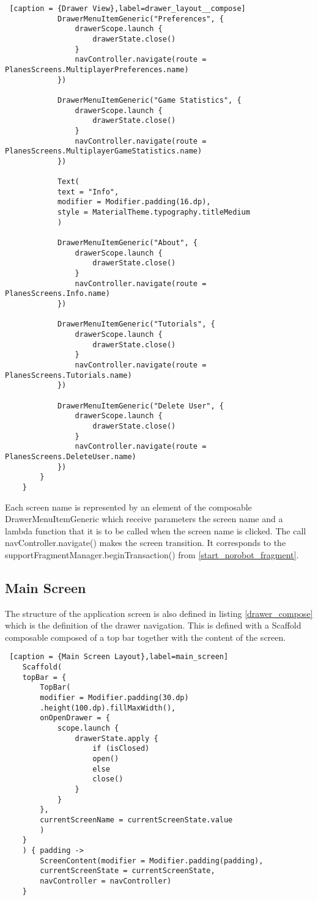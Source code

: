 \begin{lstlisting} [caption = {Drawer View},label=drawer_layout__compose]
			DrawerMenuItemGeneric("Preferences", {
				drawerScope.launch {
					drawerState.close()
				}
				navController.navigate(route = PlanesScreens.MultiplayerPreferences.name)
			})
			
			DrawerMenuItemGeneric("Game Statistics", {
				drawerScope.launch {
					drawerState.close()
				}
				navController.navigate(route = PlanesScreens.MultiplayerGameStatistics.name)
			})
			
			Text(
			text = "Info",
			modifier = Modifier.padding(16.dp),
			style = MaterialTheme.typography.titleMedium
			)
			
			DrawerMenuItemGeneric("About", {
				drawerScope.launch {
					drawerState.close()
				}
				navController.navigate(route = PlanesScreens.Info.name)
			})
			
			DrawerMenuItemGeneric("Tutorials", {
				drawerScope.launch {
					drawerState.close()
				}
				navController.navigate(route = PlanesScreens.Tutorials.name)
			})
			
			DrawerMenuItemGeneric("Delete User", {
				drawerScope.launch {
					drawerState.close()
				}
				navController.navigate(route = PlanesScreens.DeleteUser.name)
			})
		}
	}
\end{lstlisting}

Each screen name is represented by an element of the composable DrawerMenuItemGeneric which receive parameters the screen name and a lambda function that it is to be called when the screen name is clicked. The call navController.navigate() makes the screen transition. It corresponds to the supportFragmentManager.beginTransaction() from \ref{start_norobot_fragment}.

\subsection{Main Screen}

The structure of the application screen is also defined in listing \ref{drawer_compose} which is the definition of the drawer navigation. This is defined with a Scaffold composable composed of a top bar together with the content of the screen.

\begin{lstlisting} [caption = {Main Screen Layout},label=main_screen]
	Scaffold(
	topBar = {
		TopBar(
		modifier = Modifier.padding(30.dp)
		.height(100.dp).fillMaxWidth(),
		onOpenDrawer = {
			scope.launch {
				drawerState.apply {
					if (isClosed)
					open()
					else
					close()
				}
			}
		},
		currentScreenName = currentScreenState.value
		)
	}
	) { padding ->
		ScreenContent(modifier = Modifier.padding(padding),
		currentScreenState = currentScreenState,
		navController = navController)
	}
\end{lstlisting} 

